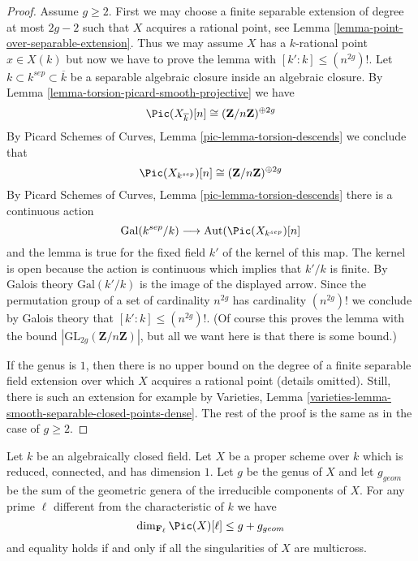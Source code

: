 \begin{proof}
Assume $g \geq 2$. First we may choose a finite separable extension
of degree at most $2g - 2$ such that $X$ acquires a rational point, see
Lemma \ref{lemma-point-over-separable-extension}.
Thus we may assume $X$ has a $k$-rational point $x \in X(k)$
but now we have to prove the lemma with
$[k' : k] \leq (n^{2g})!$.
Let $k \subset k^{sep} \subset \overline{k}$ be a separable algebraic
closure inside an algebraic closure.
By Lemma \ref{lemma-torsion-picard-smooth-projective} we have
$$
\Pic(X_{\overline{k}})[n] \cong (\mathbf{Z}/n\mathbf{Z})^{\oplus 2g}
$$
By Picard Schemes of Curves, Lemma \ref{pic-lemma-torsion-descends}
we conclude that
$$
\Pic(X_{k^{sep}})[n] \cong (\mathbf{Z}/n\mathbf{Z})^{\oplus 2g}
$$
By Picard Schemes of Curves, Lemma \ref{pic-lemma-torsion-descends}
there is a continuous action
$$
\text{Gal}(k^{sep}/k)
\longrightarrow
\text{Aut}(\Pic(X_{k^{sep}})[n]
$$
and the lemma is true for the fixed field $k'$ of the kernel of this map.
The kernel is open because the action is continuous which implies
that $k'/k$ is finite. By Galois theory $\text{Gal}(k'/k)$
is the image of the displayed arrow. Since the permutation
group of a set of cardinality $n^{2g}$ has cardinality $(n^{2g})!$
we conclude by Galois theory that $[k' : k] \leq (n^{2g})!$.
(Of course this proves the lemma with the bound
$|\text{GL}_{2g}(\mathbf{Z}/n\mathbf{Z})|$, but all we want
here is that there is some bound.)

\medskip\noindent
If the genus is $1$, then there is no upper bound on the degree of a
finite separable field extension over which $X$ acquires a rational point
(details omitted). Still, there is such an extension for example by
Varieties, Lemma \ref{varieties-lemma-smooth-separable-closed-points-dense}.
The rest of the proof is the same as in the case of $g \geq 2$.
\end{proof}

\begin{proposition}
\label{proposition-torsion-picard-reduced-proper}
Let $k$ be an algebraically closed field. Let $X$ be a proper scheme over $k$
which is reduced, connected, and has dimension $1$. Let $g$ be the genus
of $X$ and let $g_{geom}$ be the sum of the geometric genera of the
irreducible components of $X$. For any prime $\ell$ different from
the characteristic of $k$ we have
$$
\dim_{\mathbf{F}_\ell} \Pic(X)[\ell]
\leq g + g_{geom}
$$
and equality holds if and only if all the singularities of $X$
are multicross.
\end{proposition}


